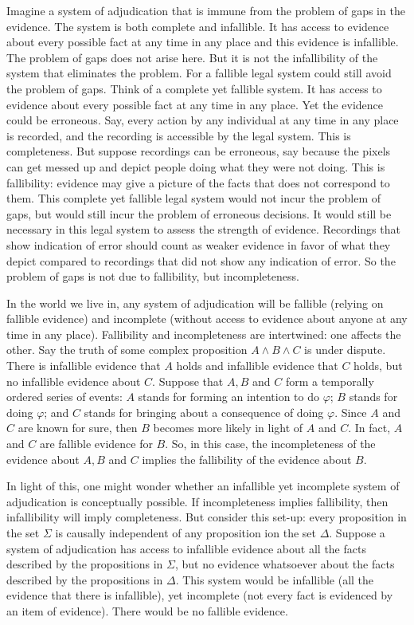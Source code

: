 \documentclass[
  10pt,
  dvipsnames,enabledeprecatedfontcommands]{scrartcl}
\begin{document}
Imagine a system of adjudication that is immune from the problem of gaps
in the evidence. The system is both complete and infallible. It has
access to evidence about every possible fact at any time in any place
and this evidence is infallible. The problem of gaps does not arise
here. But it is not the infallibility of the system that eliminates the
problem. For a fallible legal system could still avoid the problem of
gaps. Think of a complete yet fallible system. It has access to evidence
about every possible fact at any time in any place. Yet the evidence
could be erroneous. Say, every action by any individual at any time in
any place is recorded, and the recording is accessible by the legal
system. This is completeness. But suppose recordings can be erroneous,
say because the pixels can get messed up and depict people doing what
they were not doing. This is fallibility: evidence may give a picture of
the facts that does not correspond to them. This complete yet fallible
legal system would not incur the problem of gaps, but would still incur
the problem of erroneous decisions. It would still be necessary in this
legal system to assess the strength of evidence. Recordings that show
indication of error should count as weaker evidence in favor of what
they depict compared to recordings that did not show any indication of
error. So the problem of gaps is not due to fallibility, but
incompleteness.

In the world we live in, any system of adjudication will be fallible
(relying on fallible evidence) and incomplete (without access to
evidence about anyone at any time in any place). Fallibility and
incompleteness are intertwined: one affects the other. Say the truth of
some complex proposition \(A \wedge B \wedge C\) is under dispute. There
is infallible evidence that \(A\) holds and infallible evidence that
\(C\) holds, but no infallible evidence about \(C\). Suppose that
\(A, B\) and \(C\) form a temporally ordered series of events: \(A\)
stands for forming an intention to do \(\varphi\); \(B\) stands for
doing \(\varphi\); and \(C\) stands for bringing about a consequence of
doing \(\varphi\). Since \(A\) and \(C\) are known for sure, then \(B\)
becomes more likely in light of \(A\) and \(C\). In fact, \(A\) and
\(C\) are fallible evidence for \(B\). So, in this case, the
incompleteness of the evidence about \(A, B\) and \(C\) implies the
fallibility of the evidence about \(B\).

In light of this, one might wonder whether an infallible yet incomplete
system of adjudication is conceptually possible. If incompleteness
implies fallibility, then infallibility will imply completeness. But
consider this set-up: every proposition in the set \(\Sigma\) is
causally independent of any proposition ion the set \(\Delta\). Suppose
a system of adjudication has access to infallible evidence about all the
facts described by the propositions in \(\Sigma\), but no evidence
whatsoever about the facts described by the propositions in \(\Delta\).
This system would be infallible (all the evidence that there is
infallible), yet incomplete (not every fact is evidenced by an item of
evidence). There would be no fallible evidence.
\end{document}

